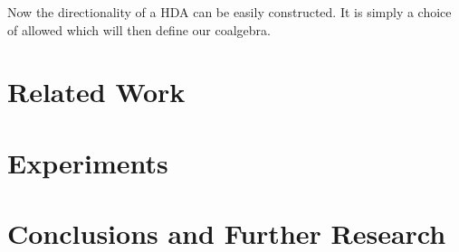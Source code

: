 \documentclass[12pt]{article}
\newcommand{\1}{\mathbbm{1}}
\begin{document}
Now the directionality of a HDA can be easily constructed. It is simply a choice of allowed which will then define our coalgebra.
\newpage
\section{Related Work}\label{relatedwork}

\section{Experiments}\label{experiments}

\section{Conclusions and Further Research}\label{conclusions}





\end{document}
